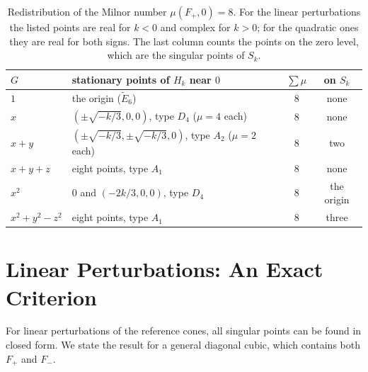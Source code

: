 \documentclass[12pt, a4paper, oneside]{book}
\theoremstyle{plain}
\theoremstyle{definition}
\theoremstyle{remark}
\begin{document}
\begin{table}[!h]
\centering
\small
\begin{tabular}{l l c c}
\toprule
$G$ & stationary points of $H_k$ near $0$ & $\sum\mu$ & on $S_k$ \\
\midrule
$1$           & the origin ($\tilde E_6$)                            & $8$ & none \\
$x$           & $(\pm\sqrt{-k/3},0,0)$, type $D_4$ ($\mu=4$ each)    & $8$ & none \\
$x+y$         & $(\pm\sqrt{-k/3},\pm\sqrt{-k/3},0)$, type $A_2$ ($\mu=2$ each) & $8$ & two \\
$x+y+z$       & eight points, type $A_1$                             & $8$ & none \\
$x^2$         & $0$ and $(-2k/3,0,0)$, type $D_4$                    & $8$ & the origin \\
$x^2+y^2-z^2$ & eight points, type $A_1$                             & $8$ & three \\
\bottomrule
\end{tabular}
\caption[Conservation of the Milnor number]{Redistribution of the Milnor
number $\mu(F_+,0)=8$. For the linear perturbations the listed points are real
for $k<0$ and complex for $k>0$; for the quadratic ones they are real for both
signs. The
last column counts the points on the zero level, which are the singular points
of $S_k$.}
\label{tab:milnor-conservation}
\end{table}

\section{Linear Perturbations: An Exact Criterion}
\label{sec:linear-perturbation}

For linear perturbations of the reference cones, all singular points can be
found in closed form. We state the result for a general diagonal cubic, which
contains both $F_+$ and $F_-$.
\end{document}
